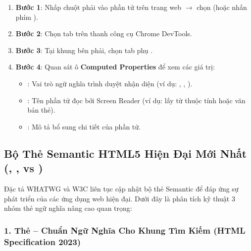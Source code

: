 \begin{center}
\begin{tcolorbox}[
    enhanced, colback=codeBg!40!white, colframe=primaryBlue!30, arc=8pt, boxrule=0.8pt,
    top=12pt, bottom=12pt, left=14pt, right=14pt,
    title={\sffamily\bfseries\small\color{primaryBlue} QUY TRÌNH 4 BƯỚC DEBUG ACCESSIBILITY TREE TRÊN CHROME DEVTOOLS}
]
\begin{enumerate}[leftmargin=1.5em, itemsep=4pt, parsep=0pt]
    \item \textbf{Bước 1}: Nhấp chuột phải vào phần tử trên trang web $\rightarrow$ chọn  (hoặc nhấn phím ).
    \item \textbf{Bước 2}: Chọn tab  trên thanh công cụ Chrome DevTools.
    \item \textbf{Bước 3}: Tại khung bên phải, chọn tab phụ .
    \item \textbf{Bước 4}: Quan sát ô \textbf{Computed Properties} để xem các giá trị:
    \begin{itemize}[leftmargin=1.2em, itemsep=2pt, parsep=0pt]
        \item {}: Vai trò ngữ nghĩa trình duyệt nhận diện (ví dụ: , , ).
        \item {}: Tên phần tử đọc bởi Screen Reader (ví dụ: lấy từ thuộc tính  hoặc văn bản thẻ).
        \item {}: Mô tả bổ sung chi tiết của phần tử.
    \end{itemize}
\end{enumerate}
\end{tcolorbox}
\end{center}
\Needspace*{120pt}
\subsection{Bộ Thẻ Semantic HTML5 Hiện Đại Mới Nhất (, ,  vs )}

Đặc tả WHATWG và W3C liên tục cập nhật bộ thẻ Semantic để đáp ứng sự phát triển của các ứng dụng web hiện đại. Dưới đây là phân tích kỹ thuật 3 nhóm thẻ ngữ nghĩa nâng cao quan trọng:

\subsubsection{1. Thẻ  -- Chuẩn Ngữ Nghĩa Cho Khung Tìm Kiếm (HTML Specification 2023)}

